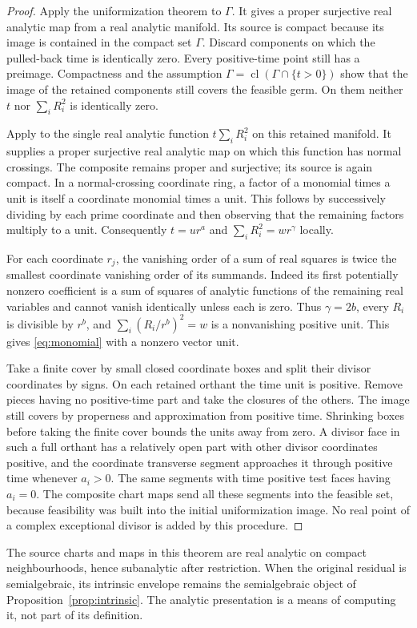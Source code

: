 \documentclass[11pt,reqno]{amsart}
\numberwithin{equation}{section}
\theoremstyle{definition}
\theoremstyle{remark}
\newcommand{\cl}{\operatorname{cl}}
\begin{document}
\begin{proof}
Apply the uniformization theorem \cite[Theorem 0.1]{BM} to $\Gamma$. It gives a proper surjective real analytic map from a real analytic manifold. Its source is compact because its image is contained in the compact set $\Gamma$. Discard components on which the pulled-back time is identically zero. Every positive-time point still has a preimage. Compactness and the assumption $\Gamma=\cl(\Gamma\cap\{t>0\})$ show that the image of the retained components still covers the feasible germ. On them neither $t$ nor $\sum_iR_i^2$ is identically zero.

Apply \cite[Corollary 4.9]{BM} to the single real analytic function
$t\sum_iR_i^2$ on this retained manifold. It supplies a proper surjective real analytic map on which this function has normal crossings. The composite remains proper and surjective; its source is again compact. In a normal-crossing coordinate ring, a factor of a monomial times a unit is itself a coordinate monomial times a unit. This follows by successively dividing by each prime coordinate and then observing that the remaining factors multiply to a unit. Consequently $t=u r^a$ and $\sum_iR_i^2=w r^\gamma$ locally.

For each coordinate $r_j$, the vanishing order of a sum of real squares is twice the smallest coordinate vanishing order of its summands. Indeed its first potentially nonzero coefficient is a sum of squares of analytic functions of the remaining real variables and cannot vanish identically unless each is zero. Thus $\gamma=2b$, every $R_i$ is divisible by $r^b$, and $\sum_i(R_i/r^b)^2=w$ is a nonvanishing positive unit. This gives \eqref{eq:monomial} with a nonzero vector unit.

Take a finite cover by small closed coordinate boxes and split their divisor coordinates by signs. On each retained orthant the time unit is positive. Remove pieces having no positive-time part and take the closures of the others. The image still covers by properness and approximation from positive time. Shrinking boxes before taking the finite cover bounds the units away from zero. A divisor face in such a full orthant has a relatively open part with other divisor coordinates positive, and the coordinate transverse segment approaches it through positive time whenever $a_i>0$. The same segments with time positive test faces having $a_i=0$. The composite chart maps send all these segments into the feasible set, because feasibility was built into the initial uniformization image. No real point of a complex exceptional divisor is added by this procedure.
\end{proof}
The source charts and maps in this theorem are real analytic on compact neighbourhoods, hence subanalytic after restriction. When the original residual is semialgebraic, its intrinsic envelope remains the semialgebraic object of Proposition~\ref{prop:intrinsic}. The analytic presentation is a means of computing it, not part of its definition.
\end{document}

